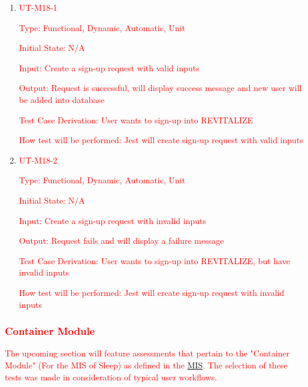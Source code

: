 \documentclass[12pt, titlepage]{article}
\begin{document}
\begin{enumerate}

	\item{\textcolor{red}{UT-M18-1\\}}

	\textcolor{red}{Type: Functional, Dynamic, Automatic, Unit}

	\textcolor{red}{Initial State: N/A}

	\textcolor{red}{Input: Create a sign-up request with valid inputs}

	\textcolor{red}{Output: Request is successful, will display success message and new user will be added into database}

	\textcolor{red}{Test Case Derivation: User wants to sign-up into REVITALIZE}

	\textcolor{red}{How test will be performed: Jest will create sign-up request with valid inputs}

	\item{\textcolor{red}{UT-M18-2\\}}

	\textcolor{red}{Type: Functional, Dynamic, Automatic, Unit}

	\textcolor{red}{Initial State: N/A}

	\textcolor{red}{Input: Create a sign-up request with invalid inputs}

	\textcolor{red}{Output: Request fails and will display a failure message}

	\textcolor{red}{Test Case Derivation: User wants to sign-up into REVITALIZE, but have invalid inputs}

	\textcolor{red}{How test will be performed: Jest will create sign-up request with invalid inputs}

\end{enumerate}

\subsubsection{\textcolor{red}{Container Module}}

\textcolor{red}{The upcoming section will feature assessments that pertain to the "Container Module" (For the MIS of Sleep) as defined in the \href{https://github.com/BillNguyen1999/REVITALIZE/blob/main/docs/Design/SoftDetailedDes/MIS.pdf}{\color{blue}MIS}. The selection of these tests was made in consideration of typical user workflows.}
\end{document}
